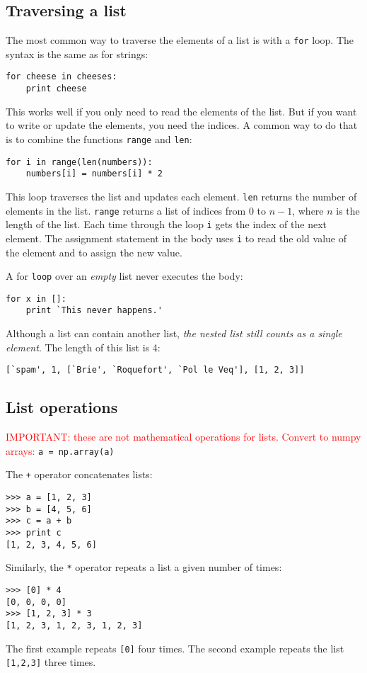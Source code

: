 \documentclass{article}
\begin{document}
\subsection{Traversing a list}
\par The most common way to traverse the elements of a list is with a
\verb|for| loop. The syntax is the same as for strings:
\begin{verbatim}
for cheese in cheeses:
    print cheese
\end{verbatim}
\par This works well if you only need to read the elements of the list. But if
you want to write or update the elements, you need the indices. A common
way to do that is to combine the functions \verb|range| and \verb|len|:
\begin{verbatim}
for i in range(len(numbers)):
    numbers[i] = numbers[i] * 2
\end{verbatim}
\par This loop traverses the list and updates each element.
\verb|len| returns the
number of elements in the list. \verb|range| returns a list of indices from 0
to $n-1$, where $n$ is the length of the list. Each time through the
loop \verb|i| gets the index of the next element. The assignment statement in
the body uses \verb|i| to read the old value of the element and to assign the
new value.
\par A for \verb|loop| over an \emph{empty} list never executes the body:
\begin{verbatim}
for x in []:
    print `This never happens.'
\end{verbatim}
\par Although a list can contain another list, \emph{the nested list still
counts as a single element}. The length of this list is 4:
\begin{verbatim}
[`spam', 1, [`Brie', `Roquefort', `Pol le Veq'], [1, 2, 3]]
\end{verbatim}
\subsection{List operations}
\textcolor{red}{IMPORTANT: these are not mathematical operations
for lists. Convert to numpy arrays:} \verb|a = np.array(a)|
\par The \verb|+| operator concatenates lists:
\begin{verbatim}
>>> a = [1, 2, 3]
>>> b = [4, 5, 6]
>>> c = a + b
>>> print c
[1, 2, 3, 4, 5, 6]
\end{verbatim}
\par Similarly, the \verb|*| operator repeats a list a given number of times:
\begin{verbatim}
>>> [0] * 4
[0, 0, 0, 0]
>>> [1, 2, 3] * 3
[1, 2, 3, 1, 2, 3, 1, 2, 3]
\end{verbatim}
\par The first example repeats \verb|[0]| four times. The second example
repeats the list \verb|[1,2,3]| three times.
\end{document}
